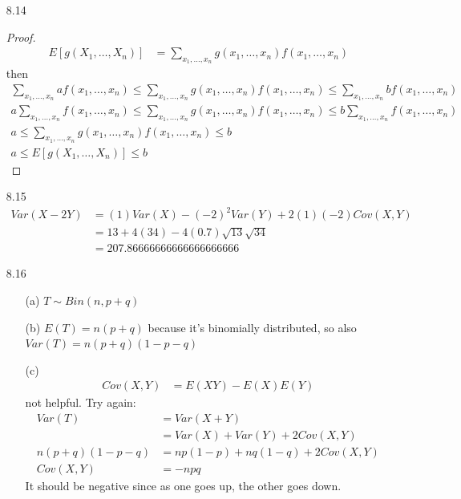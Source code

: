 \documentclass[english, 11pt]{article}
\begin{document}
\begin{itemize}
  \item[8.14]
  \begin{proof}
    \begin{align*}
      E[g(X_1,\ldots,X_n)] & = \sum_{x_1,\ldots,x_n}g(x_1,\ldots,x_n)f(x_1,\ldots,x_n)
    \end{align*}
    then
    \begin{align*}
       \sum_{x_1,\ldots,x_n}af(x_1,\ldots,x_n) \leq \sum_{x_1,\ldots,x_n}g(x_1,\ldots,x_n)f(x_1,\ldots,x_n) \leq \sum_{x_1,\ldots,x_n}bf(x_1,\ldots,x_n) \\
        a\sum_{x_1,\ldots,x_n}f(x_1,\ldots,x_n) \leq \sum_{x_1,\ldots,x_n}g(x_1,\ldots,x_n)f(x_1,\ldots,x_n) \leq b\sum_{x_1,\ldots,x_n}f(x_1,\ldots,x_n) \\
        a \leq \sum_{x_1,\ldots,x_n}g(x_1,\ldots,x_n)f(x_1,\ldots,x_n) \leq b \\
        a \leq  E[g(X_1,\ldots,X_n)]  \leq b
    \end{align*}
  \end{proof}

  \item[8.15]
  \begin{align*}
    Var(X - 2Y) & = (1)Var(X) - (-2)^2Var(Y) + 2(1)(-2)Cov(X,Y) \\
                & = 13 + 4(34) - 4(0.7)\sqrt{13}\sqrt{34} \\
                & = 207.86666666666666666666
  \end{align*}

  \item[8.16]
  \begin{itemize}
    \item[(a)] $T \sim Bin(n, p + q)$
    \item[(b)] $E(T) = n(p+q)$ because it's binomially distributed, so also $Var(T) = n(p+q)(1-p-q)$
    \item[(c)]
    \begin{align*}
      Cov(X,Y) & = E(XY) - E(X)E(Y)
    \end{align*}
    not helpful. Try again:
    \begin{align*}
      Var(T) & = Var(X + Y) \\
             & = Var(X) + Var(Y) + 2Cov(X,Y) \\
      n(p+q)(1-p-q) & = np(1-p) + nq(1-q) + 2Cov(X,Y) \\
            Cov(X,Y) & = -npq
    \end{align*}
    It should be negative since as one goes up, the other goes down.
  \end{itemize}


\end{itemize}
\end{document}
